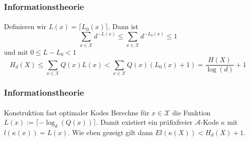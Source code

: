 \documentclass{beamer}
\begin{document}
\begin{frame}
    \frametitle{Informationstheorie}
\framesubtitle{}

\begin{block}{}
Definieren wir $L(x) = \lceil L_0(x) \rceil$. Dann ist 
$$ \sum_{x \in \mathcal{X}} d^{-L(x)} \leq \sum_{x \in \mathcal{X}} d^{-L_0(x)} \leq  1$$
und mit $0 \leq L - L_0 < 1$ 
$$ H_d(X) \leq  \sum_{x \in \mathcal{X}} Q(x) L(x) <  \sum_{x \in \mathcal{X}} Q(x) (L_0(x) +1) = \frac{H(X)}{\log(d)} +1$$ 
\end{block}

 \end{frame}

\begin{frame}
    \frametitle{Informationstheorie}
\framesubtitle{}

\begin{block}{Konstruktion fast optimaler Kodes}
Berechne für $x \in \mathcal{X}$ die Funktion $L(x) := \lceil -\log_d(Q(x)) \rceil$. Damit existiert ein präfixfreier $\mathcal{A}$-Kode
$\kappa$ mit $l(\kappa(x)) = L(x)$. Wie eben gezeigt gilt dann $El(\kappa(X)) < H_d(X) +1$.
\end{block}

 \end{frame}
\end{document}
